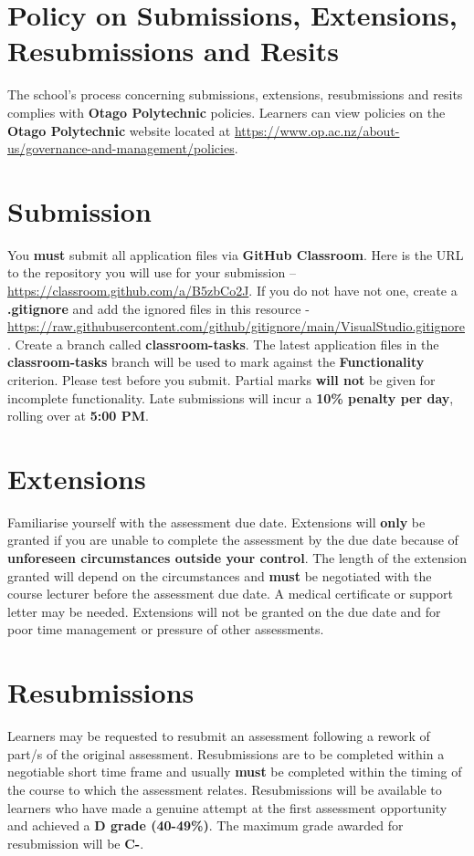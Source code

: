 \documentclass{article}
\begin{document}
\section*{Policy on Submissions, Extensions, Resubmissions and Resits}
The school's process concerning submissions, extensions, resubmissions and resits complies with \textbf{Otago Polytechnic} policies. Learners can view policies on the \textbf{Otago Polytechnic} website located at \href{https://www.op.ac.nz/about-us/governance-and-management/policies}{https://www.op.ac.nz/about-us/governance-and-management/policies}.

\section*{Submission}
You \textbf{must} submit all application files via \textbf{GitHub Classroom}. Here is the URL to the repository you will use for your submission – \href{https://classroom.github.com/a/B5zbCo2J}{https://classroom.github.com/a/B5zbCo2J}. If you do not have not one, create a \textbf{.gitignore} and add the ignored files in this resource - \href{https://raw.githubusercontent.com/github/gitignore/main/VisualStudio.gitignore}{https://raw.githubusercontent.com/github/gitignore/main/VisualStudio.gitignore}. Create a branch called \textbf{classroom-tasks}. The latest application files in the \textbf{classroom-tasks} branch will be used to mark against the \textbf{Functionality} criterion. Please test before you submit. Partial marks \textbf{will not} be given for incomplete functionality. Late submissions will incur a \textbf{10\% penalty per day}, rolling over at \textbf{5:00 PM}.

\section*{Extensions}
Familiarise yourself with the assessment due date. Extensions will \textbf{only} be granted if you are unable to complete the assessment by the due date because of \textbf{unforeseen circumstances outside your control}. The length of the extension granted will depend on the circumstances and \textbf{must} be negotiated with the course lecturer before the assessment due date. A medical certificate or support letter may be needed. Extensions will not be granted on the due date and for poor time management or pressure of other assessments.

\section*{Resubmissions}
Learners may be requested to resubmit an assessment following a rework of part/s of the original assessment. Resubmissions are to be completed within a negotiable short time frame and usually \textbf{must} be completed within the timing of the course to which the assessment relates. Resubmissions will be available to learners who have made a genuine attempt at the first assessment opportunity and achieved a \textbf{D grade (40-49\%)}. The maximum grade awarded for resubmission will be \textbf{C-}.
\end{document}
